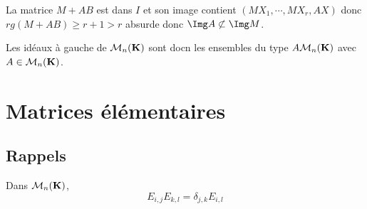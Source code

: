 La matrice $M+AB$ est dans $I$ et son image contient $(MX_1,\cdots,MX_r,AX)$ donc $rg(M+AB)\geq r+1 >r$ absurde donc $\Img A \not \subset \Img M$.

Les idéaux à gauche de $\mathcal M_n(\mathbf K)$ sont docn les ensembles du type $A \mathcal M_n(\mathbf K)$ avec $A \in \mathcal M_n(\mathbf K)$.


\section{Matrices élémentaires}

\subsection{Rappels}

\begin{rem}
    Dans $ \mathcal  M_n(\mathbf K)$,
\[
E_{i,j}E_{k,l}=\delta_{j,k}E_{i,l}
\] 
\end{rem}

